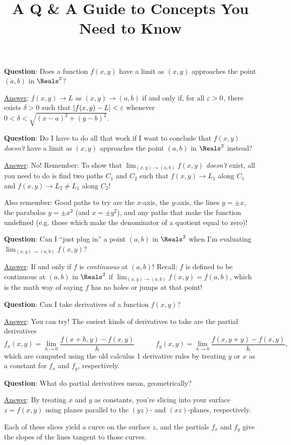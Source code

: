 \documentclass[12pt]{article}
\title{\vspace{-0.75in}\LARGE{A Q \& A Guide to Concepts You Need to Know}\vspace{-0.5in}}
\date{}
\renewcommand{\Q}{\vspace{6mm}\noindent\textbf{Question}: }
\newcommand{\Ans}{\ul{Answer}: }
\begin{document}
	\maketitle\vspace{-9mm}
	
	\Q Does a function $f(x,y)$ have a limit as $(x,y)$ approaches the point $(a,b)$ in $\Reals^2$?
	
	\Ans $f(x,y)\to L$ as $(x,y)\to (a,b)$ if and only if, for all $\varepsilon>0$, there exists $\delta>0$ such that $|f(x,y)-L|<\varepsilon$  whenever $0<\delta<\sqrt{(x-a)^2+(y-b)^2}.$
	
	\Q Do I have to do all that work if I want to conclude that $f(x,y)$ \textit{doesn't} have a limit as $(x,y)$ approaches the point $(a,b)$ in $\Reals^2$ instead?
	
	\Ans No! Remember: To show that $\lim_{(x,y)\to(a,b)}f(x,y)$ \textit{doesn't} exist, all you need to do is find two paths $C_1$ and $C_2$ such that $f(x,y)\to L_1$ along $C_1$ and $f(x,y)\to L_2\neq L_1$ along $C_2$! 
	
	Also remember: Good paths to try are the $x$-axis, the $y$-axis, the lines $y=\pm x$, the parabolas $y=\pm x^2$ (and $x=\pm y^2$), and any paths that make the function undefined (e.g. those which make the denominator of a quotient equal to zero)!
	
	\Q Can I ``just plug in'' a point $(a,b)$ in $\Reals^2$ when I'm evaluating $\lim_{(x,y)\to(a,b)}f(x,y)$?
	
	\Ans If and only if $f$ is \textit{continuous} at $(a,b)$! Recall: $f$ is defined to be continuous at $(a,b)$ in $\Reals^2$ if $\lim_{(x,y)\to(a,b)}f(x,y)=f(a,b)$, which is the math way of saying $f$ has no holes or jumps at that point!
	
	\Q Can I take derivatives of a function $f(x,y)$?
	
	\Ans You can try! The easiest kinds of derivatives to take are the partial derivatives
	$$f_x(x,y)=\lim_{h\to0}\frac{f(x+h,y)-f(x,y)}{h} \quad\quad\quad f_y(x,y)=\lim_{h\to0}\frac{f(x,y+y)-f(x,y)}{h},$$
	which are computed using the old calculus 1 derivative rules by treating $y$ or $x$ as a constant for $f_x$ and $f_y$, respectively.
	
	\Q What do partial derivatives mean, geometrically?
	
	\Ans By treating $x$ and $y$ as constants, you're slicing into your surface $z=f(x,y)$ using planes parallel to the $(yz)$- and $(xz)$-planes, respectively. 
	
	Each of these slices yield a curve on the surface $z$, and the partials $f_x$ and $f_y$ give the slopes of the lines tangent to those curves.
	
\end{document}
